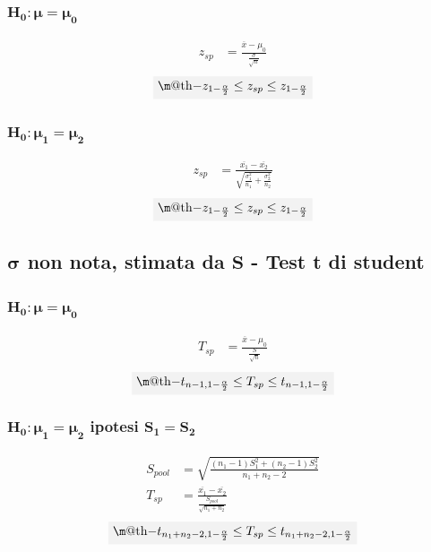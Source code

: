 \documentclass[fontsize=8pt]{scrartcl}
\makeatletter
\newcommand*{\boxcolor}{light-gray}
\renewcommand{\boxed}[1]{
    \textcolor{\boxcolor}{%
        \tikz[baseline={([yshift=-1ex]current bounding box.center)}]
        \node [fill=light-gray, minimum width=1ex,draw]
        {\normalcolor\m@th$\displaystyle#1$};
    }
}
\makeatother
\begin{document}
\begin{multicols*}{2}
\subsubsection*{\(\mathbf{H_0:\mu=\mu_0}\)}

\begin{align*}
    z_{sp}&=\frac{\overline{x}-\mu_0}{\frac{\sigma}{\sqrt{n}}}
\end{align*}
\begin{equation*}
    \boxed{-z_{1-\frac{\alpha}{2}}\leq z_{sp} \leq z_{1-\frac{\alpha}{2}}}
\end{equation*}

\subsubsection*{\(\mathbf{H_0:\mu_1=\mu_2}\)}

\begin{align*}
    z_{sp}&=\frac{\overline{x_1}-\overline{x_2}}{\sqrt{\frac{\sigma_1^2}{n_1}+\frac{\sigma_2^2}{n_2}}}    
\end{align*}
\begin{equation*}
   \boxed{-z_{1-\frac{\alpha}{2}}\leq z_{sp} \leq z_{1-\frac{\alpha}{2}}}
\end{equation*}

\subsection*{\(\mathbf{\sigma}\) non nota, stimata da \(\mathbf{S}\) - Test t di student}

\subsubsection*{\(\mathbf{H_0:\mu=\mu_0}\)}
\begin{align*}
    T_{sp}&=\frac{\overline{x}-\mu_0}{\frac{S}{\sqrt{n}}}    
\end{align*}
\begin{equation*}
    \boxed{-t_{n-1,1-\frac{\alpha}{2}}\leq T_{sp} \leq t_{n-1,1-\frac{\alpha}{2}}}
\end{equation*}
\subsubsection*{\(\mathbf{H_0:\mu_1=\mu_2}\) ipotesi \(\mathbf{S_1=S_2}\)}
\begin{align*}
    S_{pool}&=\sqrt{\frac{(n_1-1)S_1^2+(n_2-1)S_2^2}{n_1+n_2-2}}\\
    T_{sp}&=\frac{\overline{x_1}-\overline{x_2}}{\frac{S_{pool}}{\sqrt{n_1+n_2}}}    
\end{align*}
\begin{equation*}
    \boxed{-t_{n_1+n_2-2,1-\frac{\alpha}{2}}\leq T_{sp} \leq t_{n_1+n_2-2,1-\frac{\alpha}{2}}}
\end{equation*}

\end{multicols*}
\end{document}
